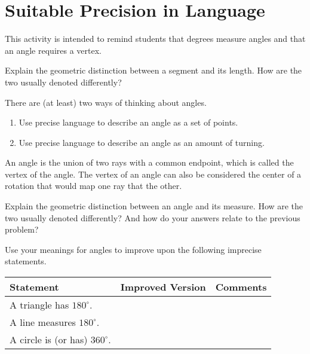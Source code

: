 \newpage
\section{Suitable Precision in Language}

\begin{teachingnote}
This activity is intended to remind students that degrees measure angles and that an angle requires a vertex. 
\end{teachingnote}

\begin{prob}
Explain the geometric distinction between a segment and its length.  How are the two usually denoted differently?  
\end{prob}
\vspace{.4in}

\begin{prob}
There are (at least) two ways of thinking about angles.  
\begin{enumerate}
\item Use precise language to describe an angle as a set of points.  
\vspace{.4in}
\item Use precise language to describe an angle as an amount of turning.  
\end{enumerate}
\vspace{.4in}
\end{prob}
\begin{teachingnote}
An angle is the union of two rays with a common endpoint, which is called the vertex of the angle.  The vertex of an angle can also be considered the center of a rotation that would map one ray that the other.  
\end{teachingnote}

\begin{prob}
Explain the geometric distinction between an angle and its measure.  How are the two usually denoted differently?  And how do your answers relate to the previous problem?  
\end{prob}
\vspace{.8in}

\newpage
\begin{prob}
Use your meanings for angles to improve upon the following imprecise statements. 

{\renewcommand{\arraystretch}{1.5}
\begin{tabular}{|>{\centering\arraybackslash}m{4cm}|>{\centering\arraybackslash}m{9.5cm}|>{\centering\arraybackslash}m{4cm}|}\hline
Statement & Improved Version & Comments \\\hline

\rule{0pt}{1cm}A triangle has $180^\circ$. & & \\ \hline

\rule{0pt}{1cm}A line measures $180^\circ$. & & \\ \hline

\rule{0pt}{1cm}A circle is (or has) $360^\circ$. & & \\ \hline
 \hline
\end{tabular}}
\end{prob}

